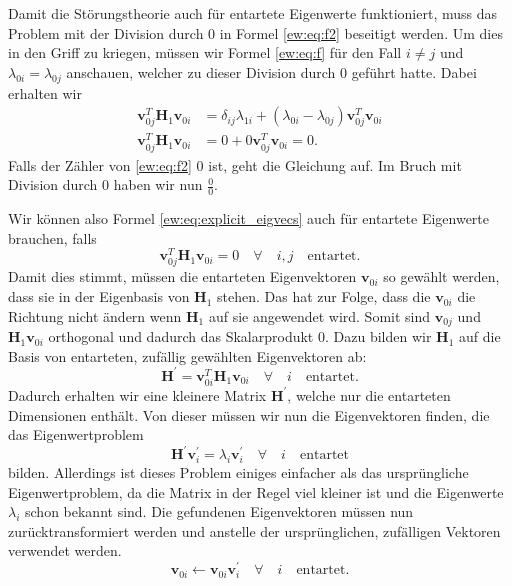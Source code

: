 Damit die Störungstheorie auch für entartete Eigenwerte funktioniert, muss das Problem mit der Division durch $0$ in Formel \eqref{ew:eq:f2} beseitigt werden.
Um dies in den Griff zu kriegen, müssen wir Formel \eqref{ew:eq:f} für den Fall $i \neq j$ und $\lambda_{0i} = \lambda_{0j}$ anschauen, welcher zu dieser Division durch $0$ geführt hatte.
Dabei erhalten wir
\begin{align}
    \bm v_{0j}^T \bm H_1 \bm v_{0i}
    &=
    \delta_{ij} \lambda_{1i} +
    ( \lambda_{0i} - \lambda_{0j} )
    \bm v_{0j}^T  \bm v_{0i} \nonumber
    \\
    \bm v_{0j}^T \bm H_1 \bm v_{0i}
    &=
    0 +
    0
    \bm v_{0j}^T  \bm v_{0i}
    = 0.
\end{align}
Falls der Zähler von \eqref{ew:eq:f2} $0$ ist, geht die Gleichung auf.
Im Bruch mit Division durch $0$ haben wir nun $\frac{0}{0}$.

Wir können also Formel \eqref{ew:eq:explicit_eigvecs} auch für entartete Eigenwerte brauchen, falls
\begin{equation}
    \bm v_{0j}^T \bm H_1 \bm v_{0i} = 0 \quad \forall \quad i,j \quad \text{entartet}. \label{ew:eq:condition-degenerated}
\end{equation}
Damit dies stimmt, müssen die entarteten Eigenvektoren $\bm v_{0i}$ so gewählt werden, dass sie in der Eigenbasis von $\bm H_1$ stehen.
Das hat zur Folge, dass die  $\bm v_{0i}$ die Richtung nicht ändern wenn $\bm H_1$ auf sie angewendet wird.
Somit sind $\bm v_{0j}$ und $\bm H_1 \bm v_{0i}$ orthogonal und dadurch das Skalarprodukt $0$.
Dazu bilden wir $\bm H_1$ auf die Basis von entarteten, zufällig gewählten Eigenvektoren ab:
\begin{equation}
    \bm H^\prime = \bm v_{0i}^T \bm H_1 \bm v_{0i} \quad \forall \quad i \quad \text{entartet}.
\end{equation}
Dadurch erhalten wir eine kleinere Matrix $\bm H^\prime$, welche nur die entarteten Dimensionen enthält.
Von dieser müssen wir nun die Eigenvektoren finden, die das Eigenwertproblem
\begin{equation}
    \bm H^\prime \bm v_{i}^\prime = \lambda_{i} \bm v_i^\prime \quad \forall \quad i \quad \text{entartet}
\end{equation}
bilden.
Allerdings ist dieses Problem einiges einfacher als das ursprüngliche Eigenwertproblem, da die Matrix in der Regel viel kleiner ist und die Eigenwerte $\lambda_i$ schon bekannt sind.
Die gefundenen Eigenvektoren müssen nun zurücktransformiert werden und anstelle der ursprünglichen, zufälligen Vektoren verwendet werden.
\begin{equation}
    \bm v_{0i} \gets \bm v_{0i} \bm v_{i}^\prime \quad \forall \quad i \quad \text{entartet}.
\end{equation}

